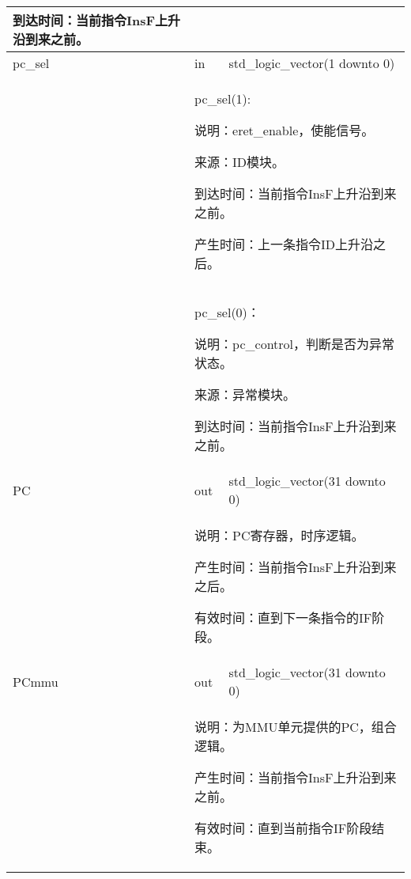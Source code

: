 \begin{tabularx}{\textwidth}{lll}
{                到达时间：当前指令InsF上升沿到来之前。
            } \\
            \midrule
            pc\_sel         & in        & std\_logic\_vector(1 downto 0) \\
            \cmidrule(l){2-3}
            &
            \multicolumn{2}{X}{
                pc\_sel(1):

                    说明：eret\_enable，使能信号。

                    来源：ID模块。

                    到达时间：当前指令InsF上升沿到来之前。

                    产生时间：上一条指令ID上升沿之后。
            } \\
            &
            \multicolumn{2}{X}{
                pc\_sel(0)：

                    说明：pc\_control，判断是否为异常状态。

                    来源：异常模块。

                    到达时间：当前指令InsF上升沿到来之前。
            } \\
            \midrule
            PC              & out       & std\_logic\_vector(31 downto 0) \\
            \cmidrule(l){2-3}
            &
            \multicolumn{2}{X}{
                说明：PC寄存器，时序逻辑。

                产生时间：当前指令InsF上升沿到来之后。

                有效时间：直到下一条指令的IF阶段。
            } \\
            \midrule
            PCmmu           & out       & std\_logic\_vector(31 downto 0) \\
            \cmidrule(l){2-3}
            &
            \multicolumn{2}{X}{
                说明：为MMU单元提供的PC，组合逻辑。

                产生时间：当前指令InsF上升沿到来之前。

                有效时间：直到当前指令IF阶段结束。
            } \\
            \bottomrule
        \end{tabularx}
